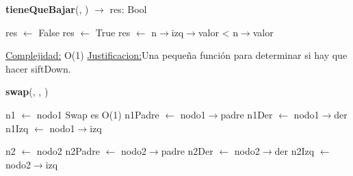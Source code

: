\begin{Representacion}
\begin{Algoritmos}
\begin{algorithm}[H]{\textbf{tieneQueBajar}(, ) $\to$ res: Bool}
	\begin{algorithmic}[1]
	
			\State res $\gets$ False
		\Else
				\State res $\gets$ True
			\Else
				\State res $\gets$ n$\to$izq$\to$valor < n$\to$valor	
			\EndIf
		\EndIf

		\medskip
		\Statex \underline{Complejidad:} O(1)
			\Statex \underline{Justificacion:}Una pequeña función para determinar si hay que hacer siftDown. 
	\end{algorithmic}
\end{algorithm}

\begin{algorithm}[H]{\textbf{swap}(, , )}
	\begin{algorithmic}[1]
		\begin{scriptsize}
		
		\State n1 $\gets$ nodo1 \Comment Swap es O(1)
		\State n1Padre $\gets$ nodo1$\to$padre
		\State n1Der $\gets$ nodo1$\to$der
		\State n1Izq $\gets$ nodo1$\to$izq
		
		\State n2 $\gets$ nodo2
		\State n2Padre $\gets$ nodo2$\to$padre
		\State n2Der $\gets$ nodo2$\to$der
		\State n2Izq $\gets$ nodo2$\to$izq
		

\end{scriptsize}
\end{algorithmic}
\end{algorithm}
\end{Algoritmos}
\end{Representacion}
